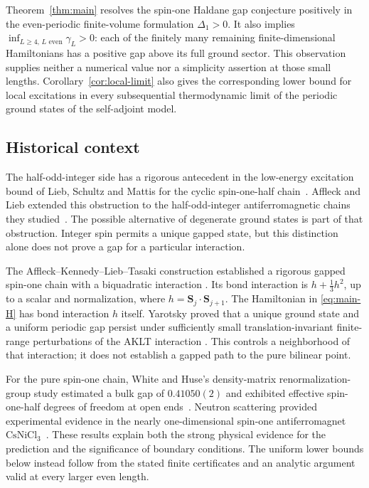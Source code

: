 Theorem~\ref{thm:main} resolves the spin-one Haldane gap conjecture
positively in the even-periodic finite-volume formulation
$\Delta_1>0$. It also implies $\inf_{L\ge4,\,L\text{ even}}\gamma_L>0$:
each of the finitely many remaining finite-dimensional Hamiltonians has
a positive gap above its full ground sector. This observation supplies
neither a numerical value nor a simplicity assertion at those small
lengths.
Corollary~\ref{cor:local-limit} also gives the corresponding lower bound
for local excitations in every subsequential thermodynamic limit of the
periodic ground states of the self-adjoint model.

\subsection{Historical context}

The half-odd-integer side has a rigorous antecedent in the low-energy
excitation bound of Lieb, Schultz and Mattis for the cyclic spin-one-half
chain~\cite[Appendix~B, Theorem~2]{LiebSchultzMattis1961}.
Affleck and Lieb extended this obstruction to the half-odd-integer
antiferromagnetic chains they studied~\cite{AffleckLieb1986}. The possible alternative of degenerate
ground states is part of that obstruction. Integer spin permits a unique
gapped state, but this distinction alone does not prove a gap for a
particular interaction.

The Affleck--Kennedy--Lieb--Tasaki construction established a rigorous
gapped spin-one chain with a biquadratic interaction
\cite{AKLT1987,AKLT1988}. Its bond interaction is
$h+\tfrac13h^2$, up to a scalar and normalization, where
$h=\mathbf S_j\cdot\mathbf S_{j+1}$. The Hamiltonian in
\eqref{eq:main-H} has bond interaction $h$ itself.
Yarotsky proved that a unique ground state and a uniform periodic gap
persist under sufficiently small translation-invariant finite-range
perturbations of the AKLT interaction
\cite[arXiv v1, Theorems~1 and~3]{Yarotsky2006}.
This controls a neighborhood of that interaction; it does not establish
a gapped path to the pure bilinear point.

For the pure spin-one chain, White and Huse's density-matrix
renormalization-group study
estimated a bulk gap of $0.41050(2)$ and exhibited effective spin-one-half
degrees of freedom at open ends~\cite{WhiteHuse1993}. Neutron scattering
provided experimental evidence in the nearly one-dimensional spin-one
antiferromagnet $\mathrm{CsNiCl}_3$~\cite{Buyers1986}.
These results explain both the strong
physical evidence for the prediction and the significance of boundary
conditions. The uniform lower bounds below instead follow from the
stated finite certificates and an analytic argument valid at every
larger even length.

